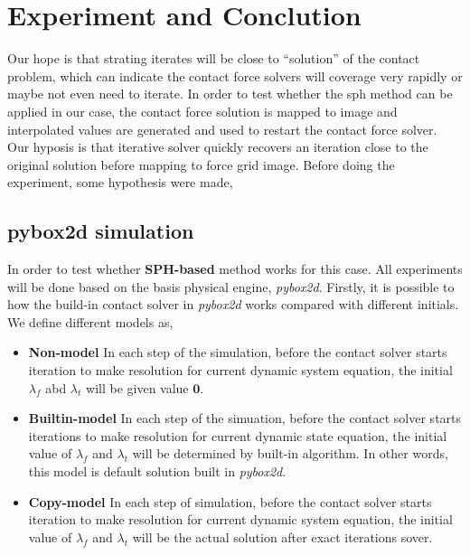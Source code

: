 \section{Experiment and Conclution}
    \label{sec:sph-exp}
    Our hope is that strating iterates will be close to ``solution'' of the contact problem, which can indicate the contact force solvers will coverage very rapidly or maybe not even need to iterate. In order to test whether the sph method can be applied in our case, the contact force solution is mapped to image and interpolated values are generated and used to restart the contact force solver. Our hyposis is that iterative solver quickly recovers an iteration close to the original solution before mapping to force grid image. Before doing the experiment, some hypothesis were made, 

\subsection{pybox2d simulation}
    \label{sph:exp}
    In order to test whether \textbf{SPH-based} method works for this case. All experiments will be done based on the basis physical engine, \textit{pybox2d}. Firstly, it is possible to how the build-in contact solver in \textit{pybox2d} works compared with different initials. We define different models as,
    \begin{itemize}
        \item \textbf{Non-model} In each step of the simulation, before the contact solver starts iteration to make resolution for current dynamic system equation, the initial $\lambda_{f}$ abd $\lambda_{t}$ will be given value $\pmb{0}$.
        \item \textbf{Builtin-model} In each step of the simuation, before the contact solver starts iterations to make resolution for current dynamic state equation, the initial value of $\lambda_f$ and $\lambda_{t}$ will be determined by built-in algorithm. In other words, this model is default solution built in \textit{pybox2d}.
        \item \textbf{Copy-model} In each step of simulation, before the contact solver starts iteration to make resolution for current dynamic system equation, the initial value of $\lambda_f$ and $\lambda_t$ will be the actual solution after exact iterations sover.
    \end{itemize}
